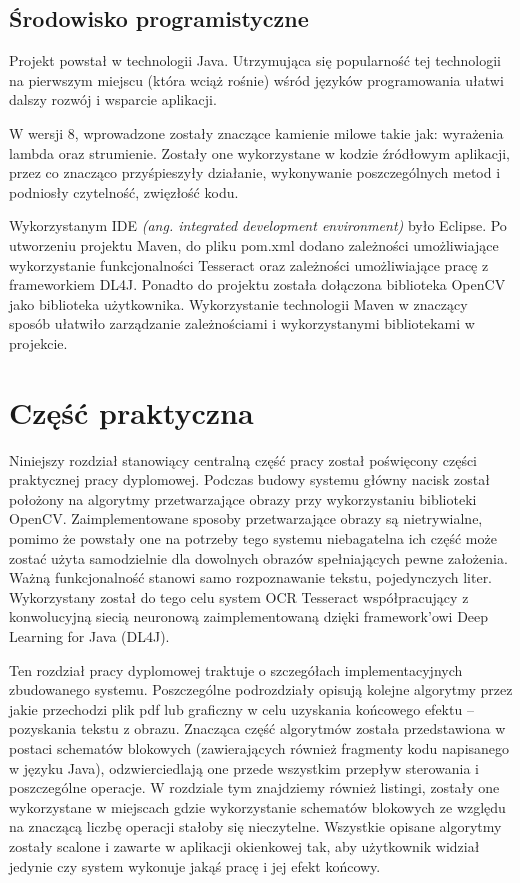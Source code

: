 \documentclass[a4paper,12pt]{article}
\newcommand\spacingIndent{2.2em}
\begin{document}
	\subsection{Środowisko programistyczne}
		\hspace{\spacingIndent} Projekt powstał w technologii Java. Utrzymująca się popularność tej technologii na pierwszym miejscu 
			(która wciąż rośnie) \cite{16}
			wśród języków programowania ułatwi dalszy rozwój i wsparcie aplikacji. 
		
		 W wersji 8, wprowadzone zostały znaczące kamienie milowe takie jak: wyrażenia lambda oraz strumienie. Zostały one wykorzystane 
			w kodzie źródłowym aplikacji, przez co znacząco przyśpieszyły działanie, wykonywanie poszczególnych metod i podniosły czytelność, zwięzłość kodu. 
        
		Wykorzystanym IDE \textit{(ang. integrated development environment)} było Eclipse. Po utworzeniu projektu Maven, do pliku pom.xml 
			dodano zależności umożliwiające wykorzystanie funkcjonalności Tesseract oraz zależności umożliwiające pracę z frameworkiem DL4J. 
			Ponadto do projektu została dołączona biblioteka OpenCV jako biblioteka użytkownika. Wykorzystanie technologii Maven 
			w znaczący sposób ułatwiło zarządzanie zależnościami i wykorzystanymi bibliotekami w projekcie.
        \newpage
        
\section{Część praktyczna}
    \hspace{\spacingIndent} 
    Niniejszy rozdział stanowiący centralną część pracy został poświęcony części praktycznej pracy dyplomowej.  Podczas budowy systemu główny nacisk został położony na algorytmy przetwarzające obrazy przy wykorzystaniu biblioteki OpenCV. Zaimplementowane sposoby przetwarzające obrazy są nietrywialne, pomimo że powstały one na potrzeby tego systemu niebagatelna ich część może zostać użyta samodzielnie dla dowolnych obrazów spełniających pewne założenia. Ważną funkcjonalność stanowi samo rozpoznawanie tekstu, pojedynczych liter. Wykorzystany został do tego celu system OCR Tesseract współpracujący z konwolucyjną siecią neuronową zaimplementowaną dzięki framework'owi Deep Learning for Java (DL4J). 
    
    Ten rozdział pracy dyplomowej traktuje o szczegółach implementacyjnych zbudowanego systemu. Poszczególne podrozdziały opisują kolejne algorytmy przez jakie przechodzi plik pdf lub graficzny w celu uzyskania końcowego efektu -- pozyskania tekstu z obrazu. Znacząca część algorytmów została przedstawiona w postaci schematów blokowych (zawierających również fragmenty kodu napisanego w języku Java), odzwierciedlają one przede wszystkim przepływ sterowania i poszczególne operacje. W rozdziale tym znajdziemy również listingi, zostały one wykorzystane w miejscach gdzie wykorzystanie schematów blokowych ze względu na znaczącą liczbę operacji stałoby się nieczytelne. Wszystkie opisane algorytmy zostały scalone i zawarte w aplikacji okienkowej tak, aby użytkownik widział jedynie czy system wykonuje jakąś pracę i jej efekt końcowy. 
    
\end{document}
